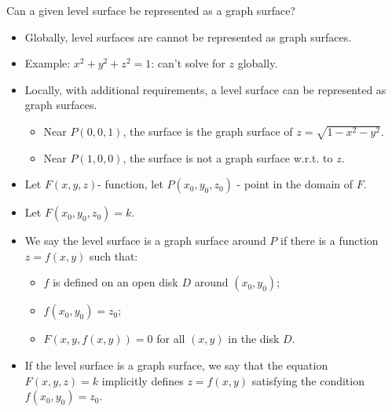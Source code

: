 \begin{frame}
\begin{question}
Can a given level surface be represented as a graph surface?
\end{question}
\begin{itemize}
\item<2-> \alert<1->{Globally}, level surfaces are \alert<1->{cannot} be represented as graph surfaces.

\item<3-> Example: $x^2+y^2+z^2= 1$: can't solve for $z$ globally. 
\item<5-> \alert<1->{Locally, } with additional requirements, a level surface \alert<1->{can} be represented as graph surfaces. 

\begin{itemize}
\item<6-> Near $P(0,0,1)$, the surface is the graph surface of $z = \sqrt{1-x^2-y^2}$.
\item<7-> Near $P(1, 0, 0)$, the surface is not a graph surface w.r.t. to $z$.
\end{itemize} 
\end{itemize}
\end{frame}

\begin{frame}
\begin{itemize}
\item<1-> Let $F(x,y,z)$- function, let $P(x_0,y_0,z_0)$ - point in the domain of $F$.
\item<2-> Let $F(x_0,y_0,z_0)=k$.
\item<3-> We say the level surface is a graph surface around $P$ if there is a function $z=f(x,y)$ such that:
\begin{itemize}
\item<4-> $f$ is defined on an open disk $D$ around $(x_0,y_0)$;
\item<5-> $f(x_0,y_0) = z_0$;
\item<6-> $F(x,y,f(x,y)) = 0$ for all $(x,y)$ in the disk $D$.
\end{itemize}
\item<7-> If the level surface is a graph surface, we say that the equation $F(x,y,z) = k$ \alert<1->{implicitly} defines $z=f(x,y)$ satisfying the condition $f(x_0,y_0) = z_0$.

\end{itemize}
\end{frame}